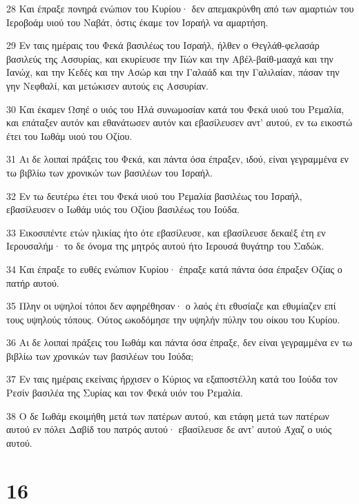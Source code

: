 \par 28 Και έπραξε πονηρά ενώπιον του Κυρίου· δεν απεμακρύνθη από των αμαρτιών του Ιεροβοάμ υιού του Ναβάτ, όστις έκαμε τον Ισραήλ να αμαρτήση.
\par 29 Εν ταις ημέραις του Φεκά βασιλέως του Ισραήλ, ήλθεν ο Θεγλάθ-φελασάρ βασιλεύς της Ασσυρίας, και εκυρίευσε την Ιϊών και την Αβέλ-βαίθ-μααχά και την Ιανώχ, και την Κεδές και την Ασώρ και την Γαλαάδ και την Γαλιλαίαν, πάσαν την γην Νεφθαλί, και μετώκισεν αυτούς εις Ασσυρίαν.
\par 30 Και έκαμεν Ωσηέ ο υιός του Ηλά συνωμοσίαν κατά του Φεκά υιού του Ρεμαλία, και επάταξεν αυτόν και εθανάτωσεν αυτόν και εβασίλευσεν αντ' αυτού, εν τω εικοστώ έτει του Ιωθάμ υιού του Οζίου.
\par 31 Αι δε λοιπαί πράξεις του Φεκά, και πάντα όσα έπραξεν, ιδού, είναι γεγραμμένα εν τω βιβλίω των χρονικών των βασιλέων του Ισραήλ.
\par 32 Εν τω δευτέρω έτει του Φεκά υιού του Ρεμαλία βασιλέως του Ισραήλ, εβασίλευσεν ο Ιωθάμ υιός του Οζίου βασιλέως του Ιούδα.
\par 33 Εικοσιπέντε ετών ηλικίας ήτο ότε εβασίλευσε, και εβασίλευσε δεκαέξ έτη εν Ιερουσαλήμ· το δε όνομα της μητρός αυτού ήτο Ιερουσά θυγάτηρ του Σαδώκ.
\par 34 Και έπραξε το ευθές ενώπιον Κυρίου· έπραξε κατά πάντα όσα έπραξεν Οζίας ο πατήρ αυτού.
\par 35 Πλην οι υψηλοί τόποι δεν αφηρέθησαν· ο λαός έτι εθυσίαζε και εθυμίαζεν επί τους υψηλούς τόπους. Ούτος ωκοδόμησε την υψηλήν πύλην του οίκου του Κυρίου.
\par 36 Αι δε λοιπαί πράξεις του Ιωθάμ και πάντα όσα έπραξε, δεν είναι γεγραμμένα εν τω βιβλίω των χρονικών των βασιλέων του Ιούδα;
\par 37 Εν ταις ημέραις εκείναις ήρχισεν ο Κύριος να εξαποστέλλη κατά του Ιούδα τον Ρεσίν βασιλέα της Συρίας και τον Φεκά υιόν του Ρεμαλία.
\par 38 Ο δε Ιωθάμ εκοιμήθη μετά των πατέρων αυτού, και ετάφη μετά των πατέρων αυτού εν πόλει Δαβίδ του πατρός αυτού· εβασίλευσε δε αντ' αυτού Άχαζ ο υιός αυτού.

\chapter{16}

